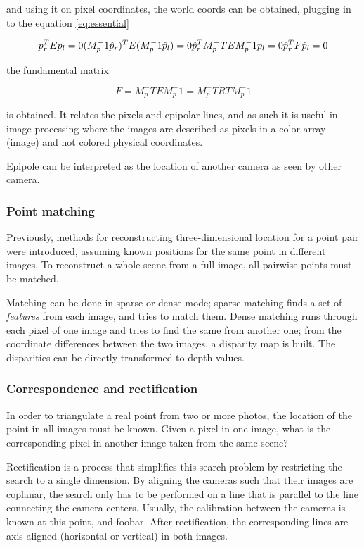 and using it on pixel coordinates, the world coords can be obtained, plugging in to the equation \ref{eq:essential}

\[
p_r^T E p_l = 0\\
(M_p^-1 \hat p_r)^T E (M_p^-1 \hat p_l) = 0\\
\hat p_r^T M_p^-T E M_p^-1 p_l = 0\\
\hat p_r^T F \hat p_l = 0
\]

the fundamental matrix

\[
F = M_p^-T E M_p^-1 = M_p^-T R T M_p^-1
\]

is obtained. It relates the pixels and epipolar lines, and as such it is useful in image processing where the images are described as pixels in a color array (image) and not colored physical coordinates.

Epipole can be interpreted as the location of another camera as seen by other camera.

\subsubsection{Point matching}

Previously, methods for reconstructing three-dimensional location for a point pair were introduced, assuming known positions for the same point in different images.
To reconstruct a whole scene from a full image, all pairwise points must be matched.

Matching can be done in sparse or dense mode; sparse matching finds a set of \textit{features} from each image, and tries to match them. Dense matching runs through each pixel of one image and tries to find the same from another one; from the coordinate differences between the two images, a disparity map is built. The disparities can be directly transformed to depth values.


\subsubsection{Correspondence and rectification}

In order to triangulate a real point from two or more photos, the location of the point in all images must be known.
Given a pixel in one image, what is the corresponding pixel in another image taken from the same scene?

Rectification is a process that simplifies this search problem by restricting the search to a single dimension.
By aligning the cameras such that their images are coplanar, the search only has to be performed on a line that is parallel to the line connecting the camera centers.
Usually, the calibration between the cameras is known at this point, and foobar.
After rectification, the corresponding lines are axis-aligned (horizontal or vertical) in both images.


